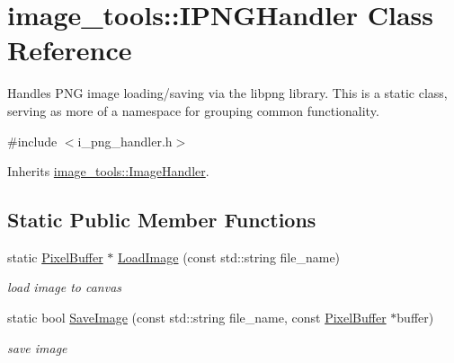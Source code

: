 \hypertarget{classimage__tools_1_1IPNGHandler}{}\section{image\+\_\+tools\+:\+:I\+P\+N\+G\+Handler Class Reference}
\label{classimage__tools_1_1IPNGHandler}


Handles P\+NG image loading/saving via the libpng library. This is a static class, serving as more of a namespace for grouping common functionality.  




{\ttfamily \#include $<$i\+\_\+png\+\_\+handler.\+h$>$}



Inherits \hyperlink{classimage__tools_1_1ImageHandler}{image\+\_\+tools\+::\+Image\+Handler}.

\subsection*{Static Public Member Functions}
\begin{DoxyCompactItemize}
\item 
static \hyperlink{classimage__tools_1_1PixelBuffer}{Pixel\+Buffer} $\ast$ \hyperlink{classimage__tools_1_1IPNGHandler_a9ba654404b6584117fd03a260826c29b}{Load\+Image} (const std\+::string file\+\_\+name)\hypertarget{classimage__tools_1_1IPNGHandler_a9ba654404b6584117fd03a260826c29b}{}\label{classimage__tools_1_1IPNGHandler_a9ba654404b6584117fd03a260826c29b}

\begin{DoxyCompactList}\small\item\em load image to canvas \end{DoxyCompactList}\item 
static bool \hyperlink{classimage__tools_1_1IPNGHandler_ad69a60ad7d6f971d2b39c9cbb1e338c7}{Save\+Image} (const std\+::string file\+\_\+name, const \hyperlink{classimage__tools_1_1PixelBuffer}{Pixel\+Buffer} $\ast$buffer)\hypertarget{classimage__tools_1_1IPNGHandler_ad69a60ad7d6f971d2b39c9cbb1e338c7}{}\label{classimage__tools_1_1IPNGHandler_ad69a60ad7d6f971d2b39c9cbb1e338c7}

\begin{DoxyCompactList}\small\item\em save image \end{DoxyCompactList}\end{DoxyCompactItemize}

